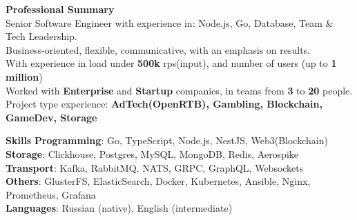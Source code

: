 \documentclass{resume}
\begin{document}

\begin{rSection}{\textbf{Professional Summary}}
{
\\ Senior Software Engineer with experience in: Node.js, Go, Database, Team \& Tech Leadership.
\\ Business-oriented, flexible, communicative, with an emphasis on results.
\\ With experience in load under \textbf{500k} rps(input), and  number of users (up to \textbf{1 million})
\\ Worked with \textbf{Enterprise} and \textbf{Startup} companies, in teams from \textbf{3} to \textbf{20} people.
\\ Project type experience: \textbf{AdTech(OpenRTB), Gambling, Blockchain, GameDev, Storage}
}

\end{rSection}
\begin{rSection}{\textbf{Skills}}
    \textbf{Programming}: Go, TypeScript, Node.js, NestJS, Web3(Blockchain)
    \\ \textbf{Storage}: Clickhouse, Postgres, MySQL, MongoDB, Redis, Aerospike
    \\ \textbf{Transport}: Kafka, RabbitMQ, NATS, GRPC, GraphQL, Websockets
    \\ \textbf{Others}: GlusterFS, ElasticSearch, Docker, Kubernetes, Ansible, Nginx, Prometheus, Grafana
    \\ \textbf{Languages}: Russian (native), English (intermediate)
\end{rSection}
\end{document}
